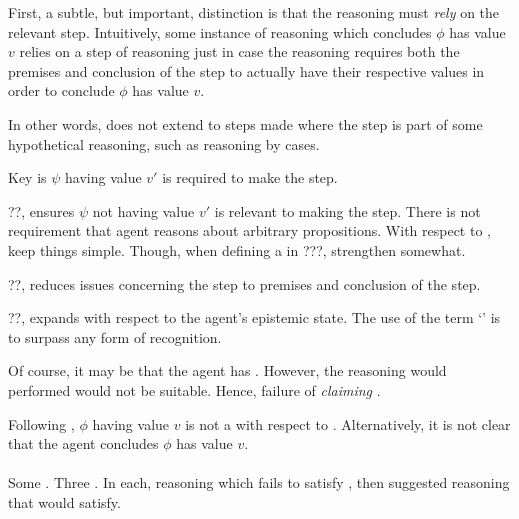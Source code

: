 \begin{note}[Relying]
  First, a subtle, but important, distinction is that the reasoning must \emph{rely} on the relevant step.
  Intuitively, some instance of reasoning which concludes \(\phi\) has value \(v\) relies on a step of reasoning just in case the reasoning requires both the premises and conclusion of the step to actually have their respective values in order to conclude \(\phi\) has value \(v\).

  In other words, \ideaCS{} does not extend to steps made where the step is part of some hypothetical reasoning, such as reasoning by cases.
\end{note}

\begin{note}
  Key is \(\psi\) having value \(v'\) is required to make the step.

  ??, ensures \(\psi\) not having value \(v'\) is relevant to making the step.
  There is not requirement that agent reasons about arbitrary \epVAd{} propositions.
  With respect to \ideaCS{}, keep things simple.
  Though, when defining a \requ{} in ???, strengthen somewhat.

  ??, reduces issues concerning the step to premises and conclusion of the step.

  ??, expands with respect to the agent's epistemic state.
  The use of the term `\committed{}' is to surpass any form of recognition.
\end{note}

\begin{note}
  Of course, it may be that the agent has \support{}.
  However, the reasoning would performed would not be suitable.
  Hence, failure of \emph{claiming} \support{}.

  Following \ideaS{}, \(\phi\) having value \(v\) is not a \sink{} with respect to .
  Alternatively, it is not clear that the agent concludes \(\phi\) has value \(v\).
\end{note}

\paragraph{}

\begin{note}
  Some .
  Three .
  In each, reasoning which fails to satisfy \ideaCS{}, then suggested reasoning that would satisfy.
\end{note}


